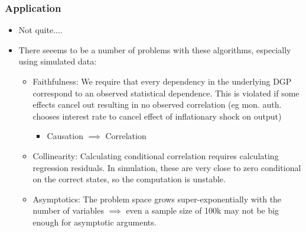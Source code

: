 \documentclass{beamer}
\begin{document}
\begin{frame}
    \frametitle{Application}
    \begin{itemize}
        \item Not quite....
        \item There seeems to be a number of problems with these algorithms, especially using simulated data:
        \begin{itemize}
            \item Faithfulness: We require that every dependency in the underlying DGP correspond to an observed statistical dependence. This is violated if some effects cancel out resulting in no observed correlation (eg mon. auth. chooses interest rate to cancel effect of inflationary shock on output)
            \begin{itemize}
                \item Causation $\implies$ Correlation
            \end{itemize}
            \item Collinearity: Calculating conditional correlation requires calculating regression residuals. In simulation, these are very close to zero conditional on the correct states, so the computation is unstable.
            \item Asymptotics: The problem space grows super-exponentially with the number of variables $\implies$ even a sample size of 100k may not be big enough for asymptotic arguments.
        \end{itemize}
    \end{itemize}
\end{frame}
\end{document}
